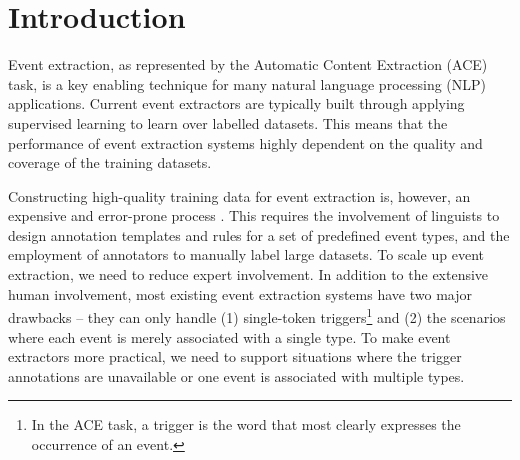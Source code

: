 \section{Introduction}
%

Event extraction, as represented by the Automatic Content Extraction (ACE) task, is a key enabling
technique for many natural language processing (NLP) applications.  Current event extractors are typically built through applying supervised learning to learn over labelled datasets. This means that the performance of event extraction systems highly dependent on the quality and coverage of the training datasets.

Constructing high-quality training data for event extraction is, however, an expensive and error-prone process \cite{aguilar2014comparison}. This requires the involvement of linguists to design annotation templates and rules for a set of predefined event types, and the employment of annotators to manually label  large datasets. To scale up event extraction, we need to reduce expert involvement.
In addition to the extensive human involvement, most existing event extraction systems have two major drawbacks -- they can only handle (1)  single-token triggers\footnote{In the ACE task, a trigger is the word that most clearly expresses the occurrence of an event.} and (2) the scenarios where  each event is merely associated with a single type.
To make event extractors more practical, we need to support situations where the trigger annotations are unavailable or one event is associated with multiple types.



